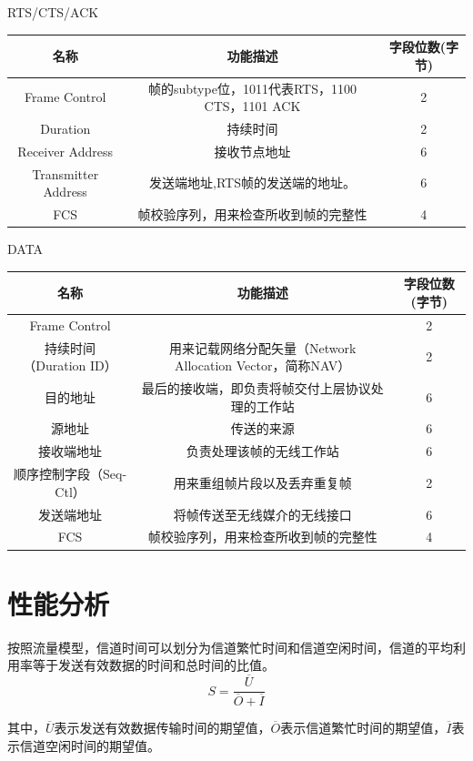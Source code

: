 RTS/CTS/ACK\\
\begin{tabular}{|c|c|c|}%
	\hline  %
	名称&功能描述&字段位数(字节)\\
	\hline  %
	Frame Control&帧的subtype位，1011代表RTS，1100 CTS，1101 ACK&2\\
	\hline %
	Duration&持续时间&2\\
	\hline
	Receiver Address&接收节点地址&6\\
	\hline
	Transmitter Address&发送端地址,RTS帧的发送端的地址。&6\\
	\hline
	FCS&帧校验序列，用来检查所收到帧的完整性&4\\
	\hline
\end{tabular}

DATA\\
\begin{tabular}{|c|c|c|}%
	\hline  %
	名称&功能描述&字段位数(字节)\\
	\hline  %
	Frame Control&  &2\\
	\hline %
	持续时间（Duration ID）&用来记载网络分配矢量（Network Allocation Vector，简称NAV）&2\\
	\hline
	目的地址&最后的接收端，即负责将帧交付上层协议处理的工作站&6\\
	\hline
	源地址&传送的来源&6\\
	\hline
	接收端地址&负责处理该帧的无线工作站&6\\
	\hline
	顺序控制字段（Seq-Ctl）&用来重组帧片段以及丢弃重复帧&2\\	
	\hline
	发送端地址&将帧传送至无线媒介的无线接口&6\\
	\hline
	FCS&帧校验序列，用来检查所收到帧的完整性&4\\
	\hline
\end{tabular}

\section {性能分析}
按照流量模型，信道时间可以划分为信道繁忙时间和信道空闲时间，信道的平均利用率等于发送有效数据的时间和总时间的比值。
\begin{equation}
S=\frac{\overline U}{\overline O+\overline I}
\end{equation}

其中，$\overline U$表示发送有效数据传输时间的期望值，$\overline O$表示信道繁忙时间的期望值，$\overline I$表示信道空闲时间的期望值。
	
